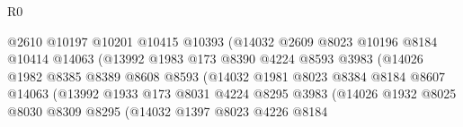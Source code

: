 \begin{lexlean}{R0}
\begin{coremodule}
                                        @2610
                                        @10197
                                        @10201
                                        @10415
                                        @10393
                                        (@14032
                                          @2609
                                          @8023
                                          @10196
                                          @8184
                                          @10414
                                          @14063
                                          (@13992
                                            @1983
                                            @173
                                            @8390
                                            @4224
                                            @8593
                                            @3983
                                            (@14026
                                              @1982
                                              @8385
                                              @8389
                                              @8608
                                              @8593
                                              (@14032
                                                @1981
                                                @8023
                                                @8384
                                                @8184
                                                @8607
                                                @14063
                                                (@13992
                                                  @1933
                                                  @173
                                                  @8031
                                                  @4224
                                                  @8295
                                                  @3983
                                                  (@14026
                                                    @1932
                                                    @8025
                                                    @8030
                                                    @8309
                                                    @8295
                                                    (@14032
                                                      @1397
                                                      @8023
                                                      @4226
                                                      @8184

\end{coremodule}
\end{lexlean}
